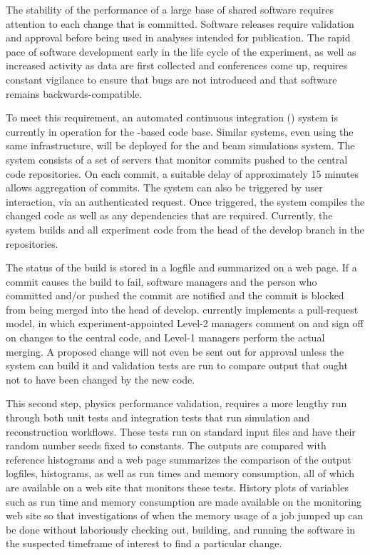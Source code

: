 \documentclass[../main-v1.tex]{subfiles}
\begin{document}
The stability of the performance of a large base of shared software requires attention to each change that is committed.  Software releases require validation and approval before being used in analyses intended for publication.  The rapid pace of software development early in the life cycle of the experiment, as well as increased activity as data are first collected and conferences come up, requires constant vigilance to ensure that bugs are not introduced and that software remains backwards-compatible.

To meet this requirement, an automated continuous integration () system is currently in operation for the -based code base.  Similar systems, even using the same infrastructure, will be deployed for the  and beam simulations system.  The  system consists of a set of servers that monitor  commits pushed to the central code repositories.  On each commit,   a suitable delay of approximately 15 minutes allows aggregation of commits. %
The  system can also be triggered by user interaction, via an authenticated request.  Once triggered, the  system  compiles the changed code as well as any dependencies that are required.  Currently, the  system builds  and all experiment code from the head of the develop branch in the repositories. 

The status of the build is stored in a logfile and summarized on a web page.  If a commit causes the build to fail, software managers and the person who committed and/or pushed the commit are notified and the commit is blocked from being merged into the head of develop.   currently implements a pull-request model, in which experiment-appointed Level-2 managers comment on and sign off on changes to the central code, and Level-1 managers perform the actual merging.  A proposed change will not even be sent out for approval unless the  system can build it and validation tests are run to compare output that ought not to have been changed by the new code.

This second step, physics performance validation, requires a more lengthy run through both unit tests and integration tests that run simulation and reconstruction workflows.  These tests run on standard input files and have their random number seeds fixed to constants.  The outputs are compared with reference histograms and a web page summarizes the comparison of the output logfiles, histograms, as well as run times and memory consumption, all of which are available on a web site that monitors these tests.  History plots of variables such as run time and memory consumption are made available on the monitoring web site so that investigations of when the memory usage of a job jumped up can be done without laboriously checking out, building, and running the software in the suspected 
timeframe of interest to find  a particular change.
\end{document}
